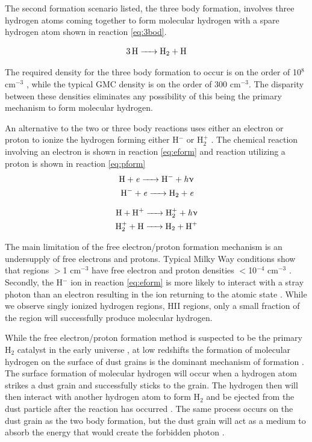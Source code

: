 The second formation scenario listed, the three body formation, involves three hydrogen atoms coming together to form molecular hydrogen with a spare hydrogen atom shown in reaction \ref{eq:3bod}.

\begin{equation}\label{eq:3bod}
  \ce{3H -> H_2 + H}
\end{equation}

The required density for the three body formation to occur is on the order of 10$^8$ cm$^{-3}$ \citep{palla1983,abel1997}, while the typical GMC density is on the order of 300 cm$^{-3}$.  The disparity between these densities eliminates any possibility of this being the primary mechanism to form molecular hydrogen. 

An alternative to the two or three body reactions uses either an electron or proton to ionize the hydrogen forming either H$^-$ or H$_2^+$ \citep{krumholz2014}.  The chemical reaction involving an electron is shown in reaction \ref{eq:eform} and reaction utilizing a proton is shown in reaction \ref{eq:pform}
\begin{equation}\label{eq:eform}
  \begin{split}
    \ce{H + \it{e} -> H^- + \it{h\nu}} \\
    \ce{H^- + \it{e} -> H_2 + \it{e}}
  \end{split}
\end{equation}

\begin{equation}\label{eq:pform}
  \begin{split}
    \ce{H + H^+ -> H^+_2 + \it{h\nu}} \\
    \ce{H^+_2 + H -> H_2 + H^+}
  \end{split}
\end{equation}

The main limitation of the free electron/proton formation mechanism is an undersupply of free electrons and protons.  Typical Milky Way conditions show that regions $>$1 cm$^{-3}$ have free electron and proton densities $<$10$^{-4}$ cm$^{-3}$ \citep{wolfire2003}.  Secondly, the H$^-$ ion in reaction \ref{eq:eform} is more likely to interact with a stray photon than an electron resulting in the ion returning to the atomic state \citep{glover2003}.  While we observe singly ionized hydrogen regions, HII regions, only a small fraction of the region will successfully produce molecular hydrogen.

While the free electron/proton formation method is suspected to be the primary H$_2$ catalyst in the early universe \citep{herbst2005}, at low redshifts the formation of molecular hydrogen on the surface of dust grains is the dominant mechanism of formation \citep{krumholz2014}.  The surface formation of molecular hydrogen will occur when a hydrogen atom strikes a dust grain and successfully sticks to the grain.  The hydrogen then will then interact with another hydrogen atom to form H$_2$ and be ejected from the dust particle after the reaction has occurred \citep{pirronello1997}.  The same process occurs on the dust grain as the two body formation, but  the dust grain will act as a medium to absorb the energy that would create the forbidden photon \citep{krumholz2014}.

